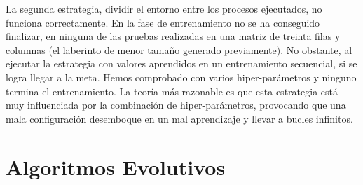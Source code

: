 		\newpage
		
		La segunda estrategia, dividir el entorno entre los procesos ejecutados, no funciona correctamente. En la fase de entrenamiento no se ha conseguido finalizar, en ninguna de las pruebas realizadas en una matriz de treinta filas y columnas (el laberinto de menor tamaño generado previamente). No obstante, al ejecutar la estrategia con valores aprendidos en un entrenamiento secuencial, si se logra llegar a la meta. Hemos comprobado con varios hiper-parámetros y ninguno termina el entrenamiento. La teoría más razonable es que esta estrategia está muy influenciada por la combinación de hiper-parámetros, provocando que una mala configuración desemboque en un mal aprendizaje y llevar a bucles infinitos.
				
		
		
	
		
	
		

\section{Algoritmos Evolutivos}

